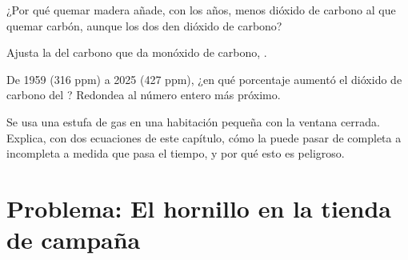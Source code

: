 \begin{exercise}[$\star\star$]\label{exo:g8:combustion-and-fuels:9}
¿Por qué quemar madera añade, con los años, menos dióxido de carbono al
 que quemar carbón, aunque los dos den dióxido de carbono?
\end{exercise}

\begin{exercise}[$\star\star$]\label{exo:g8:combustion-and-fuels:10}
Ajusta la  del carbono que da monóxido de carbono,
. %
\end{exercise}

\begin{exercise}[$\star\star\star$]\label{exo:g8:combustion-and-fuels:11}
De 1959 (316 ppm) a 2025 (427 ppm), ¿en qué porcentaje aumentó el
dióxido de carbono del ? Redondea al número entero más próximo.
\end{exercise}

\begin{exercise}[$\star\star\star$]\label{exo:g8:combustion-and-fuels:12}
Se usa una estufa de gas en una habitación pequeña con la ventana
cerrada. Explica, con dos ecuaciones de este capítulo, cómo la
 puede pasar de completa a incompleta a medida que pasa el
tiempo, y por qué esto es peligroso.
\end{exercise}

\section{Problema: El hornillo en la tienda de campaña}

